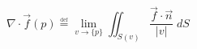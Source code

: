 \begin{equation}
\nabla \cdot \vec{f}(p)
\overset{\underset{\mathrm{def}}{}}{=}
\lim_{v\to\{p\}} \iint_{S(v)} \frac{\vec{f} \cdot \vec{n}}{|v|}  \; dS
\end{equation}
